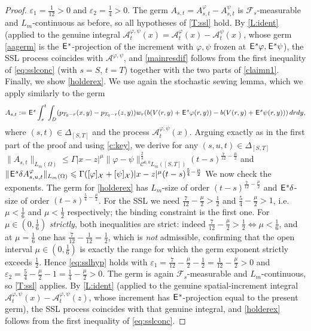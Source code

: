 \documentclass[12pt]{article}
\theoremstyle{definition}
\DeclareMathOperator{\1}{\mathbbm{1}}%
\def\E{\hskip.15ex\mathsf{E}\hskip.10ex}
\def\phi{\varphi}
\renewcommand{\le}{\leqslant}
\newcommand{\A}{\mathcal{A}}
\newcommand{\C}{\mathcal{C}}
\newcommand{\F}{\mathcal{F}}
\newcommand{\X}{\mathcal{X}}
\begin{document}
\begin{proof}
$\varepsilon_1=\tfrac1{12}>0$ and $\varepsilon_2=\tfrac14>0$. The germ
$A_{s,t}=A^\phi_{s,t}-A^\psi_{s,t}$ is $\F_s$-measurable and $L_m$-continuous as before,
so all hypotheses of \cref{T:ssl} hold. By \cref{L:ident} (applied to the genuine
integral $\A^{\phi,\psi}_t(x)=\A^\phi_t(x)-\A^\psi_t(x)$, whose germ \eqref{aagerm} is
the $\E^s$-projection of the increment with $\phi,\psi$ frozen at $\E^s\phi,\E^s\psi$),
the SSL process coincides with $\A^{\phi,\psi}$, and \eqref{mainresdif} follows from the
first inequality of \eqref{eq:sslconc} (with $s=S$, $t=T$) together with the two parts of
\eqref{claimn1}. 
Finally, we show \eqref{holderex}. We use again the stochastic sewing lemma, which we apply similarly to the germ 
\begin{equation*}
A_{s,t}:=\E^s\int_s^t \int_D( p_{T_0-r}(x,y)-p_{T_0-r}(z,y))w_r (b( V(r,y)+\E^s \phi(r,y))-b( V(r,y)+\E^s\psi(r,y)))\,dr dy, 
\end{equation*}
where $(s,t)\in\Delta_{[S,T]}$
and the process $\A^{\phi,\psi}_{t}(x)$.
Arguing exactly as in the first part of the proof and using \cref{c:key}, we derive for any $(s,u,t)\in\Delta_{[S,T]}$ 
$\|A_{s,t}\|_{L_m(\Omega)}\le  \Gamma |x-z|^\mu
\|\phi-\psi\|^{\frac23}_{\C^{0,0}L_m([S,T])}(t-s)^{\frac7{12}-\frac\mu2}$
and $
\|\E^s\delta A^\phi_{s,u,t}\|_{L_m(\Omega)}\le  \Gamma([\phi]_{\X}+[\psi]_{\X})|x-z|^\mu (t-s)^{\frac54-\frac\mu2}
$%
We now check the exponents. The germ for \eqref{holderex} has $L_m$-size of order
$(t-s)^{\frac7{12}-\frac\mu2}$ and $\E^s\delta$-size of order $(t-s)^{\frac54-\frac\mu2}$.
For the SSL we need $\frac7{12}-\frac\mu2>\frac12$ and $\frac54-\frac\mu2>1$, i.e.
$\mu<\frac16$ and $\mu<\frac12$ respectively; the binding constraint is the first one.
For $\mu\in(0,\frac16)$ \emph{strictly}, both inequalities are strict: indeed
$\frac7{12}-\frac\mu2>\frac12\iff\mu<\frac16$, and at $\mu=\frac16$ one has
$\frac7{12}-\frac1{12}=\frac12$, which is \emph{not} admissible, confirming that the
open interval $\mu\in(0,\frac16)$ is exactly the range for which the germ exponent
strictly exceeds $\frac12$. Hence \eqref{eq:sslhyp} holds with
$\varepsilon_1=\frac7{12}-\frac\mu2-\frac12=\frac1{12}-\frac\mu2>0$ and
$\varepsilon_2=\frac54-\frac\mu2-1=\frac14-\frac\mu2>0$. The germ is again
$\F_s$-measurable and $L_m$-continuous, so \cref{T:ssl} applies. By \cref{L:ident}
(applied to the genuine spatial-increment integral
$\A^{\phi,\psi}_t(x)-\A^{\phi,\psi}_t(z)$, whose increment has $\E^s$-projection equal
to the present germ), the SSL process coincides with that genuine integral, and
\eqref{holderex} follows from the first inequality of \eqref{eq:sslconc}. 
\end{proof}
\end{document}
